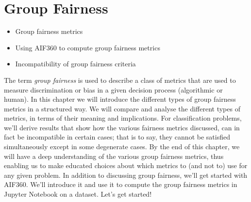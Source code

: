 \chapter{Group Fairness} \label{ch_GroupFairness}

\begin{chapsumm}
\begin{itemize}
\item Group fairness metrics
\item Using AIF360 to compute group fairness metrics
\item Incompatibility of group fairness criteria
\end{itemize}
\end{chapsumm}
%
\noindent
%
The term \emph{group fairness} is used to describe a class of metrics that are used to measure discrimination or bias in a given decision process (algorithmic or human). In this chapter we will introduce the different types of group fairness metrics in a structured way. We will compare and analyse the different types of metrics, in terms of their meaning and implications. For classification problems, we'll derive results that show how the various fairness metrics discussed, can in fact be incompatible in certain cases; that is to say, they cannot be satisfied simultaneously except in some degenerate cases. By the end of this chapter, we will have a deep understanding of the various group fairness metrics, thus enabling us to make educated choices about which metrics to (and not to) use for any given problem. In addition to discussing group fairness, we'll get started with AIF360. We'll introduce it and use it to compute the group fairness metrics in Jupyter Notebook on a dataset. Let's get started!

